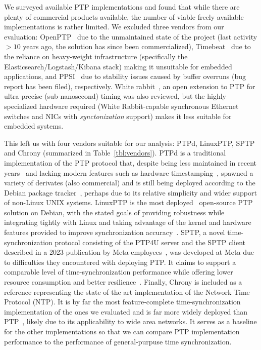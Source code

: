 We surveyed available PTP implementations and found that while there are plenty of commercial products available, the number of viable freely available implementations is rather limited. We excluded three vendors from our evaluation: OpenPTP~\cite{openptp} due to the unmaintained state of the project (last activity $>10$ years ago, the solution has since been commercialized), Timebeat~\cite{timebeat} due to the reliance on heavy-weight infrastructure (specifically the Elasticsearch/Logstash/Kibana stack) making it unsuitable for embedded applications, and PPSI~\cite{ppsi} due to stability issues caused by buffer overruns (bug report has been filed), respectively. White rabbit~\cite{white-rabbit}, an open extension to PTP for ultra-precise (sub-nanosecond) timing was also reviewed, but the highly specialized hardware required (White Rabbit-capable synchronous Ethernet switches and NICs with \emph{synctonization} support) makes it less suitable for embedded systems.

This left us with four vendors suitable for our analysis: PTPd, LinuxPTP, SPTP and Chrony (summarized in Table~\ref{tbl:vendors}).
PTPd is a traditional implementation of the PTP protocol that, despite being less maintained in recent years~\cite{ptpd-maintainers} and lacking modern features such as hardware timestamping~\cite{ptpd-manpage}, spawned a variety of derivates (also commercial) and is still being deployed according to the Debian package tracker~\cite{debian-popularity-contest}, perhaps due to its relative simplicity and wider support of non-Linux UNIX systems.
 LinuxPTP is the most deployed~\cite{debian-popularity-contest} open-source PTP solution on Debian, with the stated goals of providing robustness while integrating tightly with Linux and taking advantage of the kernel and hardware features provided to improve synchronization accuracy~\cite{linuxptp-homepage}.
SPTP, a novel time-synchronization protocol consisting of the PTP4U server and the SPTP client described in a 2023 publication by Meta employees~\cite{facebook-sptp}, was developed at Meta due to difficulties they encountered with deploying PTP. It claims to support a comparable level of time-synchronization performance while offering lower resource consumption and better resilience~\cite{facebook-sptp}.
Finally, Chrony is included as a reference representing the state of the art implementation of the Network Time Protocol (NTP). It is by far the most feature-complete time-synchronization implementation of the ones we evaluated and is far more widely deployed than PTP~\cite{debian-popularity-contest}, likely due to its applicability to wide area networks. It serves as a baseline for the other implementations so that we can compare PTP implementation performance to the performance of general-purpuse time synchronization.


